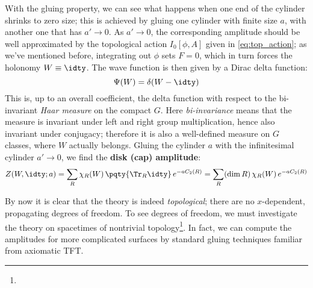 \documentclass[a4paper
	,10pt
]{article}
\begin{document}
	With the gluing property, we can see what happens when one end of the cylinder shrinks to zero size; this is achieved by gluing one cylinder with finite size $a$, with another one that has $a'\to 0$. As $a'\to 0$, the corresponding amplitude should be well approximated by the topological action $I_0[\phi,A]$ given in \eqref{eq:top_action}; as we've mentioned before, integrating out $\phi$ sets $F = 0$, which in turn forces the holonomy $W \equiv \idty$. The wave function is then given by a Dirac delta function:
	\begin{equation}
		\Psi(W) = \delta(W - \idty)
	\end{equation}
	This is, up to an overall coefficient, the delta function with respect to the bi-invariant \textit{Haar measure} on the compact $G$. Here \textit{bi-invariance} means that the measure is invariant under left and right group multiplication, hence also invariant under conjugacy; therefore it is also a well-defined measure on $G$ classes, where $W$ actually belongs. Gluing the cylinder $a$ with the infinitesimal cylinder $a'\to 0$, we find the \textbf{disk (cap) amplitude}:
	\begin{equation}
		Z(W,\idty;a)
		= \sum_R \chi_R(W)\,
			\pqty{\Tr_R \idty}\,
			e^{-aC_2(R)}
		= \sum_R (\dim R)\, \chi_R(W)\,
			e^{-aC_2(R)}
	\end{equation}
	
	By now it is clear that the theory is indeed \textit{topological}; there are no $x$-dependent, propagating degrees of freedom. To see degrees of freedom, we must investigate the theory on spacetimes of
nontrivial topology\footnote{}. In fact, we can compute the amplitudes for more complicated surfaces by standard gluing
techniques familiar from axiomatic TFT. 
	
	
	
	
	
\raggedright

\printbibliography[%
	,heading = bibintoc
]
\end{document}

